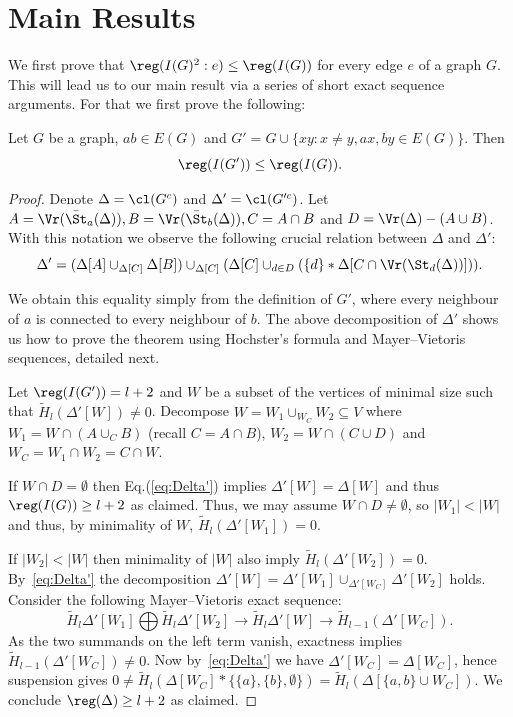 \section{Main Results}\label{sec:main_results}
 We first prove that $\reg(I(G)^2:e) \leq \reg(I(G))$ for every edge $e$ of a graph $G$. This will lead us to our main result via a series of short exact sequence arguments. For that we first prove the following:

\begin{theorem}\label{thm:reg(D')}
Let $G$ be a graph, $ab \in E(G)$ and $G'=G \cup \{xy: x\neq y,  ax,by \in E(G)\}$. Then
 $$\reg (I(G') ) \leq \reg(I(G)).$$
\end{theorem}

\begin{proof}
Denote $\Delta=\cl(G^c)$ and $\Delta'=\cl(G'^c)$.
Let $A=\Vr(\bar{\St}_a (\Delta)),B=\Vr(\bar{\St}_b(\Delta)), C=A\cap B$ and $D=\Vr(\Delta)-(A\cup B)$. With this notation we observe the following crucial relation between $\Delta$ and $\Delta'$:
\begin{equation}\label{eq:Delta'}
 \Delta'=(\Delta[A]\cup_{\Delta[C]} \Delta[B])\cup_{\Delta[C]} (\Delta[C] \cup_{d\in D} (\{d\}*\Delta[C \cap \Vr(\St_d (\Delta))])).
\end{equation}

 We obtain this equality simply from the definition of $G'$, where every neighbour of $a$ is connected to every neighbour of $b$.
 The above decomposition of $\Delta'$ shows us how to prove the theorem using Hochster's formula and Mayer--Vietoris sequences, detailed next.


 Let $\reg(I(G')) = l+2$ and $W$ be a subset of the vertices of minimal size such that $\widetilde{H}_l (\Delta'[W]) \neq 0$.
 Decompose $W=W_1 \cup_{W_C} W_2 \subseteq V$ where $W_1=W\cap(A\cup_C B)$ (recall $C=A\cap B$), $W_2=W\cap(C\cup D)$ and $W_C=W_1\cap W_2=C \cap W$.

If $W\cap D=\emptyset$ then Eq.(\ref{eq:Delta'}) implies $\Delta'[W]=\Delta[W]$ and thus $\reg(I(G))\ge l+2$ as claimed.
Thus, we may assume
$W\cap D\neq \emptyset$, so $|W_1|<|W|$ and thus, by minimality of $W$, $\widetilde{H}_l(\Delta'[W_1])=0$.

If $|W_2|<|W|$ then minimality of $|W|$ also imply $\widetilde{H}_l(\Delta'[W_2])=0$.
By~\eqref{eq:Delta'} the decomposition $\Delta'[W]=\Delta'[W_1] \cup_{\Delta'[W_C]} \Delta'[W_2]$ holds. Consider the following Mayer--Vietoris exact sequence: $$\widetilde{H}_l \Delta'[W_1] \bigoplus \widetilde{H}_l \Delta'[W_2] \longrightarrow \widetilde{H}_l \Delta'[W] \longrightarrow \widetilde{H}_{l-1} (\Delta'[W_C]).$$
As the two summands on the left term vanish, exactness implies
$\widetilde{H}_{l-1} (\Delta'[W_C])\neq 0$. 
Now by~\eqref{eq:Delta'} we have  $\Delta'[W_C]=\Delta[W_C]$, hence suspension gives
  $0 \neq \widetilde{H}_l(\Delta[W_C] * \{\{a\},\{b\},\emptyset\})= \widetilde{H}_l(\Delta[\{a,b\} \cup W_C])$.
 We conclude $\reg (\Delta) \geq l+2$ as claimed.


\end{proof}
